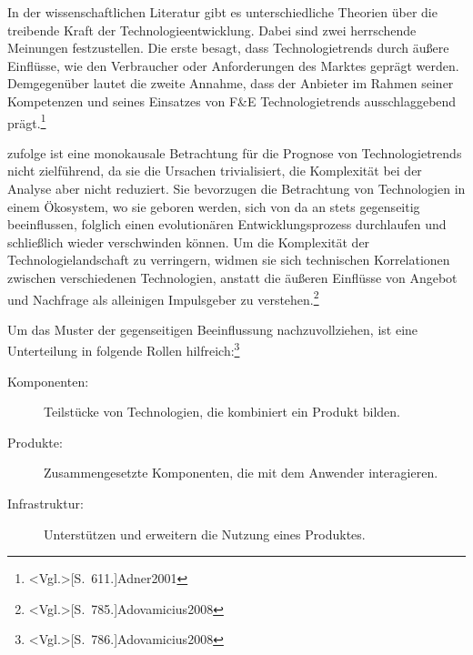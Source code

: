 In der wissenschaftlichen Literatur gibt es unterschiedliche Theorien über die treibende Kraft der Technologieentwicklung. Dabei sind zwei herrschende Meinungen festzustellen. Die erste besagt, dass Technologietrends durch äußere Einflüsse, wie den Verbraucher oder Anforderungen des Marktes geprägt werden. Demgegenüber lautet die zweite Annahme, dass der Anbieter im Rahmen seiner Kompetenzen und seines Einsatzes von F\&E Technologietrends ausschlaggebend prägt.\footnote{\citeNP<Vgl.>[S.~611.]{Adner2001}}

 zufolge ist eine monokausale Betrachtung für die Prognose von Technologietrends nicht zielführend, da sie die Ursachen trivialisiert, die Komplexität bei der Analyse aber nicht reduziert. Sie bevorzugen die Betrachtung von Technologien in einem Ökosystem, wo sie geboren werden, sich von da an stets gegenseitig beeinflussen, folglich einen evolutionären Entwicklungsprozess durchlaufen und schließlich wieder verschwinden können. Um die Komplexität der Technologielandschaft zu verringern, widmen sie sich technischen Korrelationen zwischen verschiedenen Technologien, anstatt die äußeren Einflüsse von Angebot und Nachfrage als alleinigen Impulsgeber zu verstehen.\footnote{\citeNP<Vgl.>[S.~785.]{Adovamicius2008}}

Um das Muster der gegenseitigen Beeinflussung nachzuvollziehen, ist eine Unterteilung in folgende Rollen hilfreich:\footnote{\citeNP<Vgl.>[S.~786.]{Adovamicius2008}}
\begin{description}
	\item[Komponenten:] Teilstücke von Technologien, die kombiniert ein Produkt bilden.
	\item[Produkte:] Zusammengesetzte Komponenten, die mit dem Anwender interagieren.
	\item[Infrastruktur:] Unterstützen und erweitern die Nutzung eines Produktes.
\end{description}

%

